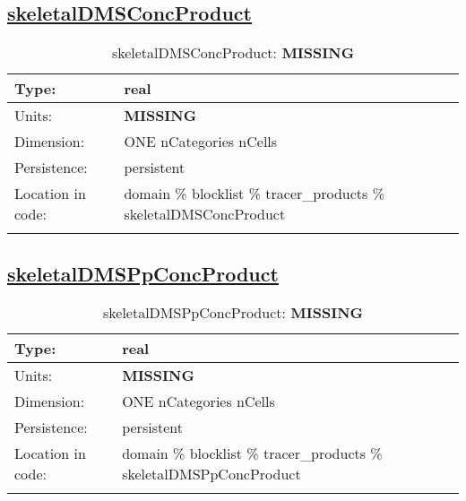 \subsection[skeletalDMSConcProduct]{\hyperref[sec:var_tab_tracer_products]{skeletalDMSConcProduct}}
\label{subsec:var_sec_tracer_products_skeletalDMSConcProduct}
\begin{center}
\begin{longtable}{| p{2.0in} | p{4.0in} |}
        \hline 
        Type: & real \\
        \hline 
        Units: & {\bf \color{red} MISSING} \\
        \hline 
        Dimension: & ONE nCategories nCells \\
        \hline 
        Persistence: & persistent \\
        \hline 
         Location in code: & domain \% blocklist \% tracer\_products \% skeletalDMSConcProduct \\
         \hline 
    \caption{skeletalDMSConcProduct: {\bf \color{red} MISSING}}
\end{longtable}
\end{center}
\subsection[skeletalDMSPpConcProduct]{\hyperref[sec:var_tab_tracer_products]{skeletalDMSPpConcProduct}}
\label{subsec:var_sec_tracer_products_skeletalDMSPpConcProduct}
\begin{center}
\begin{longtable}{| p{2.0in} | p{4.0in} |}
        \hline 
        Type: & real \\
        \hline 
        Units: & {\bf \color{red} MISSING} \\
        \hline 
        Dimension: & ONE nCategories nCells \\
        \hline 
        Persistence: & persistent \\
        \hline 
         Location in code: & domain \% blocklist \% tracer\_products \% skeletalDMSPpConcProduct \\
         \hline 
    \caption{skeletalDMSPpConcProduct: {\bf \color{red} MISSING}}
\end{longtable}
\end{center}
